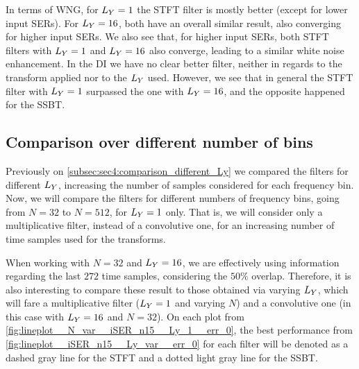 In terms of WNG, for $\Ly = 1$ the STFT filter is mostly better (except for lower input SERs). For $\Ly = 16$, both have an overall similar result, also converging for higher input SERs. We also see that, for higher input SERs, both STFT filters with $\Ly = 1$ and $\Ly = 16$ also converge, leading to a similar white noise enhancement. In the DI we have no clear better filter, neither in regards to the transform applied nor to the $\Ly$ used. However, we see that in general the STFT filter with $\Ly = 1$ surpassed the one with $\Ly = 16$, and the opposite happened for the SSBT.


\subsection{Comparison over different number of bins}

Previously on \cref{subsec:sec4:comparison_different_Ly} we compared the filters for different $\Ly$, increasing the number of samples considered for each frequency bin. Now, we will compare the filters for different numbers of frequency bins, going from $N = 32$ to $N = 512$, for $\Ly = 1$ only. That is, we will consider only a multiplicative filter, instead of a convolutive one, for an increasing number of time samples used for the transforms.

When working with $N = 32$ and $\Ly = 16$, we are effectively using information regarding the last $272$ time samples, considering the $50\%$ overlap. Therefore, it is also interesting to compare these result to those obtained via varying $\Ly$, which will fare a multiplicative filter ($\Ly = 1$ and varying $N$) and a convolutive one (in this case with $\Ly = 16$ and $N = 32$). On each plot from \cref{fig:lineplot__N_var__iSER_n15__Ly_1__err_0}, the best performance from \cref{fig:lineplot__iSER_n15__Ly_var__err_0} for each filter will be denoted as a dashed gray line for the STFT and a dotted light gray line for the SSBT.

